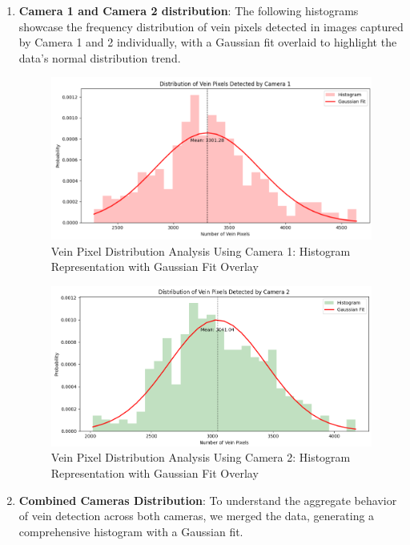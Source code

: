 \begin{enumerate}
    \item \textbf{Camera 1 and Camera 2 distribution}: The following histograms showcase the frequency distribution of vein pixels detected in images captured by Camera 1 and 2 individually, with a Gaussian fit overlaid to highlight the data's normal distribution trend.

    \begin{figure}[H]
        \centering
        \includegraphics[width=1\linewidth]{latex-img/distribution_veins_cam1.png}
        \caption{Vein Pixel Distribution Analysis Using Camera 1: Histogram Representation with Gaussian Fit Overlay}
        \label{distribution_veins_cam1}
    \end{figure}

    \begin{figure}[H]
        \centering
        \includegraphics[width=1\linewidth]{latex-img/distribution_veins_cam2.png}
        \caption{Vein Pixel Distribution Analysis Using Camera 2: Histogram Representation with Gaussian Fit Overlay}
        \label{distribution_veins_cam2}
    \end{figure}


    \item \textbf{Combined Cameras Distribution}: To understand the aggregate behavior of vein detection across both cameras, we merged the data, generating a comprehensive histogram with a Gaussian fit.


\end{enumerate}
